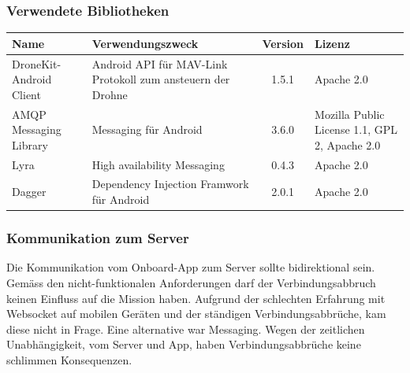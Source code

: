 \subsubsection{Verwendete Bibliotheken}
\begin{tabularx}{\textwidth}{|X|X|c|X|}
	\hline
	\textbf{Name} & \textbf{Verwendungszweck} & \textbf{Version} & \textbf{Lizenz} \\
	\hline \hline
	DroneKit-Android Client & Android API für MAV-Link Protokoll zum ansteuern der Drohne & 1.5.1 & Apache 2.0\\
	\hline 
	AMQP Messaging Library & Messaging für Android & 3.6.0 &  Mozilla Public License 1.1, GPL 2,  Apache 2.0 \\
	\hline 
	Lyra  & High availability Messaging & 0.4.3 &  Apache 2.0 \\
	\hline 
	Dagger  & Dependency Injection Framwork für Android & 2.0.1 &  Apache 2.0 \\
	\hline 
\end{tabularx}

\subsubsection{Kommunikation zum Server}

Die Kommunikation vom Onboard-App zum Server sollte bidirektional sein. 
Gemäss den nicht-funktionalen Anforderungen darf der Verbindungsabbruch keinen Einfluss auf die Mission haben.
Aufgrund der schlechten Erfahrung mit Websocket auf mobilen Geräten und der ständigen Verbindungsabbrüche, kam diese nicht in Frage. 
Eine alternative war Messaging. Wegen der zeitlichen Unabhängigkeit, vom Server und App, haben Verbindungsabbrüche keine schlimmen Konsequenzen.\\

